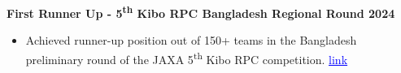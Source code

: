 \noindent
{\noindent\fontsize{12pt}{15pt}\bfseries First Runner Up - 5\textsuperscript{th} Kibo RPC Bangladesh Regional Round 2024}
\begin{itemize}[leftmargin=1em, itemsep=0em, labelsep=0.5em]
    \item Achieved runner-up position out of 150+ teams in the Bangladesh preliminary round of the JAXA 5\textsuperscript{th} Kibo RPC competition. \href{https://github.com/humam-hossain/humam-hossain/blob/main/certs/krpc5_regional_runner_up.pdf}{\textcolor{blue}{\underline{link}}}
\end{itemize}
